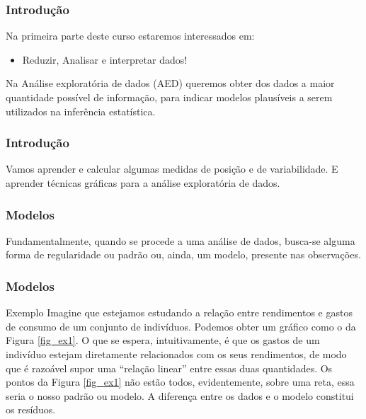 \documentclass[14pt,aspectratio=1610]{beamer}
\begin{document}
\begin{frame}{}
\frametitle{Introdução}
\begin{block}{}
\justifying
Na primeira parte deste curso estaremos interessados em:
\begin{itemize}
\item Reduzir, Analisar e interpretar dados!
\end{itemize}
\pause
Na Análise exploratória de dados (AED) queremos obter dos dados a maior
quantidade possível de informação, para indicar modelos plausíveis a serem utilizados
na inferência estatística.
\end{block}
\end{frame}

\begin{frame}{}
\frametitle{Introdução}
\begin{block}{}
\justifying
Vamos aprender e calcular algumas medidas de posição e de variabilidade. E aprender técnicas gráficas para a análise exploratória de dados. 
\end{block}
\end{frame}

\begin{frame}{}
\frametitle{Modelos}
\begin{block}{}
\justifying
Fundamentalmente, quando se procede a uma análise de dados, busca-se alguma forma de regularidade ou padrão ou, ainda, um modelo, presente nas observações.
\end{block}
\end{frame}

\begin{frame}{}
\frametitle{Modelos}
\begin{block}{Exemplo}
\justifying
Imagine que estejamos estudando a relação entre rendimentos e gastos de consumo de um conjunto de indivíduos. Podemos obter um gráfico como o da Figura 
\ref{fig_ex1}. O que se espera, intuitivamente, é que os gastos de um indivíduo estejam diretamente relacionados com os seus rendimentos, de modo que é razoável 
supor uma “relação linear” entre essas duas quantidades. Os pontos da Figura \ref{fig_ex1} não estão todos, evidentemente, sobre uma reta, essa seria o nosso padrão 
ou modelo. A diferença entre os dados e o modelo constitui os resíduos.
\end{block}
\end{frame}
\end{document}
